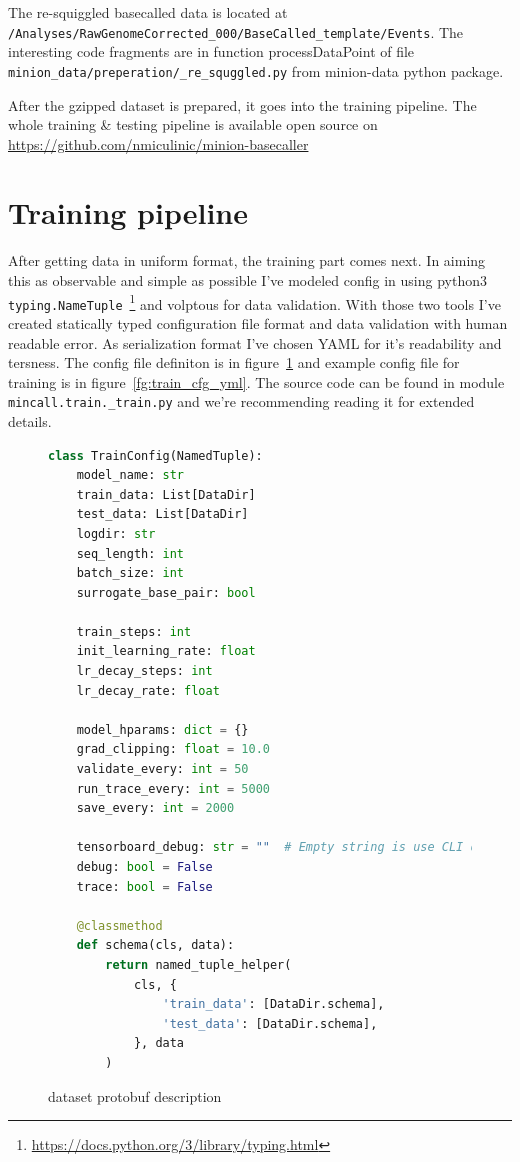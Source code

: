 \documentclass[times, utf8, diplomski, english]{fer}
\begin{document}
The re-squiggled basecalled data is located at \verb|/Analyses/RawGenomeCorrected_000/BaseCalled_template/Events|. The interesting code fragments are in function processDataPoint of file \verb|minion_data/preperation/_re_squggled.py| from minion-data python package.

After the gzipped dataset is prepared, it goes into the training pipeline. The whole training \& testing pipeline is available  open source on \url{https://github.com/nmiculinic/minion-basecaller}

\section{Training pipeline}
After getting data in uniform format, the training part comes next. In aiming this as observable and simple as possible I've modeled config in using python3 \texttt{typing.NameTuple}~\footnote{\url{https://docs.python.org/3/library/typing.html}} and volptous for data validation. 
With those two tools I've created statically typed configuration file format and data validation with human readable error. As serialization format I've chosen YAML for it's readability and tersness. 
The config file definiton is in figure~\ref{fg:train_cfg_py} and example config file for training is in figure~\ref{fg:train_cfg_yml}. The source code can be found in module \texttt{mincall.train.\_train.py} and we're recommending reading it for extended details.

\begin{figure}
    \begin{center}
    \begin{lstlisting}[language=python,style=protobuf]
class TrainConfig(NamedTuple):
    model_name: str
    train_data: List[DataDir]
    test_data: List[DataDir]
    logdir: str
    seq_length: int
    batch_size: int
    surrogate_base_pair: bool

    train_steps: int
    init_learning_rate: float
    lr_decay_steps: int
    lr_decay_rate: float

    model_hparams: dict = {}
    grad_clipping: float = 10.0
    validate_every: int = 50
    run_trace_every: int = 5000
    save_every: int = 2000

    tensorboard_debug: str = ""  # Empty string is use CLI debug
    debug: bool = False
    trace: bool = False

    @classmethod
    def schema(cls, data):
        return named_tuple_helper(
            cls, {
                'train_data': [DataDir.schema],
                'test_data': [DataDir.schema],
            }, data
        )

    \end{lstlisting}
    \caption{dataset protobuf description}
    \label{fg:train_cfg_py}
    \end{center}
\end{figure}
\end{document}

